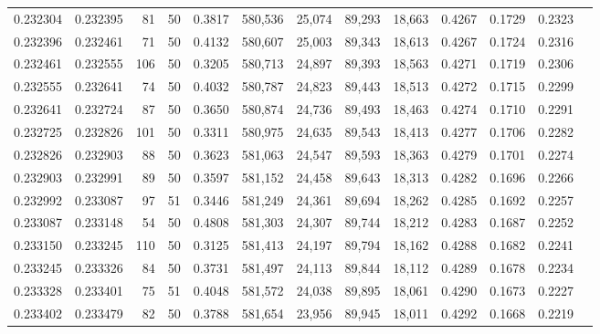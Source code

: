 \begin{tabular}{rrrrrrrrrrrrr}
0.232304 & 0.232395 &    81 &  50 &                                     0.3817 & 580,536 &  25,074 &  89,293 &  18,663 & 0.4267 & 0.1729 & 0.2323 \\
0.232396 & 0.232461 &    71 &  50 &                                     0.4132 & 580,607 &  25,003 &  89,343 &  18,613 & 0.4267 & 0.1724 & 0.2316 \\
0.232461 & 0.232555 &   106 &  50 &                                     0.3205 & 580,713 &  24,897 &  89,393 &  18,563 & 0.4271 & 0.1719 & 0.2306 \\
0.232555 & 0.232641 &    74 &  50 &                                     0.4032 & 580,787 &  24,823 &  89,443 &  18,513 & 0.4272 & 0.1715 & 0.2299 \\
0.232641 & 0.232724 &    87 &  50 &                                     0.3650 & 580,874 &  24,736 &  89,493 &  18,463 & 0.4274 & 0.1710 & 0.2291 \\
0.232725 & 0.232826 &   101 &  50 &                                     0.3311 & 580,975 &  24,635 &  89,543 &  18,413 & 0.4277 & 0.1706 & 0.2282 \\
0.232826 & 0.232903 &    88 &  50 &                                     0.3623 & 581,063 &  24,547 &  89,593 &  18,363 & 0.4279 & 0.1701 & 0.2274 \\
0.232903 & 0.232991 &    89 &  50 &                                     0.3597 & 581,152 &  24,458 &  89,643 &  18,313 & 0.4282 & 0.1696 & 0.2266 \\
0.232992 & 0.233087 &    97 &  51 &                                     0.3446 & 581,249 &  24,361 &  89,694 &  18,262 & 0.4285 & 0.1692 & 0.2257 \\
0.233087 & 0.233148 &    54 &  50 &                                     0.4808 & 581,303 &  24,307 &  89,744 &  18,212 & 0.4283 & 0.1687 & 0.2252 \\
0.233150 & 0.233245 &   110 &  50 &                                     0.3125 & 581,413 &  24,197 &  89,794 &  18,162 & 0.4288 & 0.1682 & 0.2241 \\
0.233245 & 0.233326 &    84 &  50 &                                     0.3731 & 581,497 &  24,113 &  89,844 &  18,112 & 0.4289 & 0.1678 & 0.2234 \\
0.233328 & 0.233401 &    75 &  51 &                                     0.4048 & 581,572 &  24,038 &  89,895 &  18,061 & 0.4290 & 0.1673 & 0.2227 \\
0.233402 & 0.233479 &    82 &  50 &                                     0.3788 & 581,654 &  23,956 &  89,945 &  18,011 & 0.4292 & 0.1668 & 0.2219 \\

\end{tabular}
